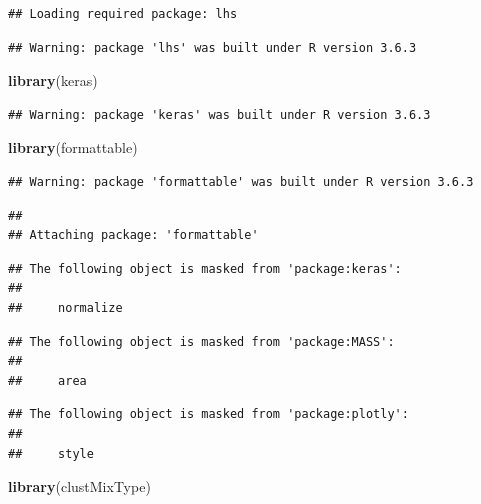 \documentclass[
]{article}
\newenvironment{Shaded}{\begin{snugshade}}{\end{snugshade}}
\newcommand{\KeywordTok}[1]{\textcolor[rgb]{0.13,0.29,0.53}{\textbf{#1}}}
\newcommand{\NormalTok}[1]{#1}
\begin{document}
\begin{verbatim}
## Loading required package: lhs
\end{verbatim}

\begin{verbatim}
## Warning: package 'lhs' was built under R version 3.6.3
\end{verbatim}

\begin{Shaded}
\begin{Highlighting}[]
\KeywordTok{library}\NormalTok{(keras)}
\end{Highlighting}
\end{Shaded}

\begin{verbatim}
## Warning: package 'keras' was built under R version 3.6.3
\end{verbatim}

\begin{Shaded}
\begin{Highlighting}[]
\KeywordTok{library}\NormalTok{(formattable)}
\end{Highlighting}
\end{Shaded}

\begin{verbatim}
## Warning: package 'formattable' was built under R version 3.6.3
\end{verbatim}

\begin{verbatim}
## 
## Attaching package: 'formattable'
\end{verbatim}

\begin{verbatim}
## The following object is masked from 'package:keras':
## 
##     normalize
\end{verbatim}

\begin{verbatim}
## The following object is masked from 'package:MASS':
## 
##     area
\end{verbatim}

\begin{verbatim}
## The following object is masked from 'package:plotly':
## 
##     style
\end{verbatim}

\begin{Shaded}
\begin{Highlighting}[]
\KeywordTok{library}\NormalTok{(clustMixType)}
\end{Highlighting}
\end{Shaded}
\end{document}
